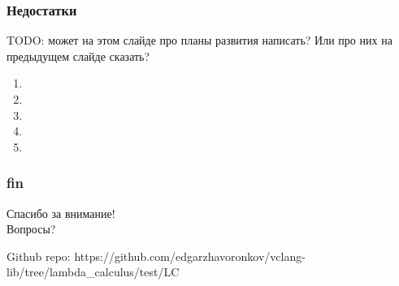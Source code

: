 \documentclass{beamer}
\begin{document}
\begin{frame}\frametitle{Недостатки}
    TODO: может на этом слайде про планы развития написать? Или про них на предыдущем слайде сказать?
    \begin{enumerate}
        \item
        \item
        \item
        \item
        \item
    \end{enumerate}
\end{frame}

\begin{frame}\frametitle{fin}
    \begin{center}
        \Huge Спасибо за внимание! \\ Вопросы?
    \end{center}

    \begin{block}{Github repo:}
        \footnotesize{https://github.com/edgarzhavoronkov/vclang-lib/tree/lambda\_calculus/test/LC}
    \end{block}
\end{frame}
\end{document}
